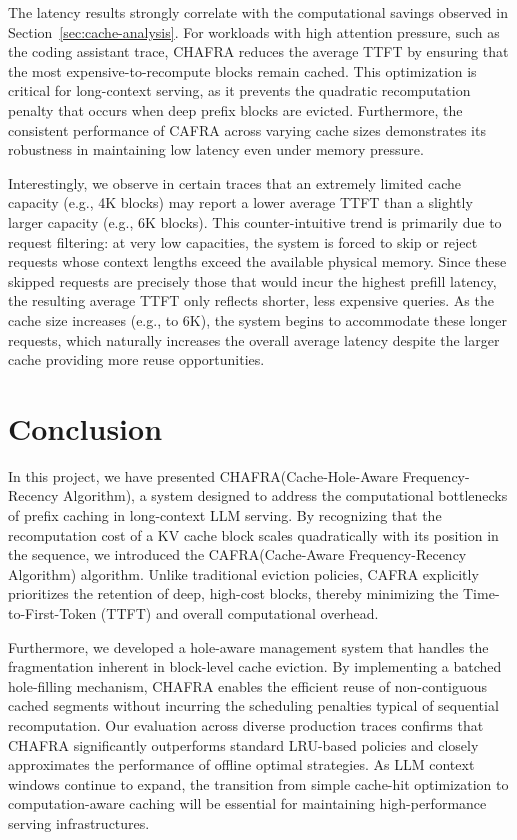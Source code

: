 \documentclass[letterpaper,twocolumn,10pt]{article}
\newcommand{\sys}{CHAFRA\xspace}
\newcommand{\sysfull}{Cache-Hole-Aware Frequency-Recency Algorithm\xspace}
\newcommand{\algo}{CAFRA\xspace}
\newcommand{\algofull}{Cache-Aware Frequency-Recency Algorithm\xspace}
\begin{document}
The latency results strongly correlate with the computational savings observed in Section~\ref{sec:cache-analysis}. For workloads with high attention pressure, such as the coding assistant trace, \sys reduces the average TTFT by ensuring that the most expensive-to-recompute blocks remain cached. This optimization is critical for long-context serving, as it prevents the quadratic recomputation penalty that occurs when deep prefix blocks are evicted. Furthermore, the consistent performance of \algo across varying cache sizes demonstrates its robustness in maintaining low latency even under memory pressure.

Interestingly, we observe in certain traces that an extremely limited cache capacity (e.g., 4K blocks) may report a lower average TTFT than a slightly larger capacity (e.g., 6K blocks). This counter-intuitive trend is primarily due to request filtering: at very low capacities, the system is forced to skip or reject requests whose context lengths exceed the available physical memory. Since these skipped requests are precisely those that would incur the highest prefill latency, the resulting average TTFT only reflects shorter, less expensive queries. As the cache size increases (e.g., to 6K), the system begins to accommodate these longer requests, which naturally increases the overall average latency despite the larger cache providing more reuse opportunities.

\section{Conclusion}

In this project, we have presented \sys (\sysfull), a system designed to address the computational bottlenecks of prefix caching in long-context LLM serving. By recognizing that the recomputation cost of a KV cache block scales quadratically with its position in the sequence, we introduced the \algo (\algofull) algorithm. Unlike traditional eviction policies, \algo explicitly prioritizes the retention of deep, high-cost blocks, thereby minimizing the Time-to-First-Token (TTFT) and overall computational overhead.

Furthermore, we developed a hole-aware management system that handles the fragmentation inherent in block-level cache eviction. By implementing a batched hole-filling mechanism, \sys enables the efficient reuse of non-contiguous cached segments without incurring the scheduling penalties typical of sequential recomputation. Our evaluation across diverse production traces confirms that \sys significantly outperforms standard LRU-based policies and closely approximates the performance of offline optimal strategies. As LLM context windows continue to expand, the transition from simple cache-hit optimization to computation-aware caching will be essential for maintaining high-performance serving infrastructures.




\end{document}
